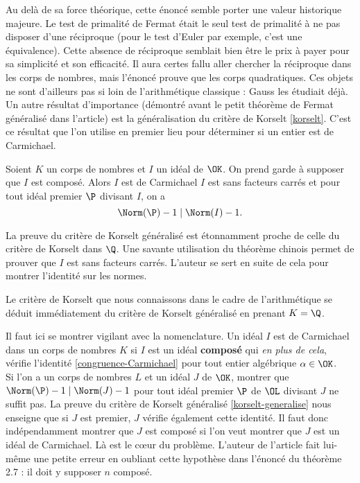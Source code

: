 Au delà de sa force théorique, cette énoncé semble porter une valeur historique majeure. Le test de primalité de Fermat était le seul test de primalité à ne pas disposer d'une réciproque (pour le test d'Euler par exemple, c'est une équivalence). Cette absence de réciproque semblait bien être le prix à payer pour sa simplicité et son efficacité. Il aura certes fallu aller chercher la réciproque dans les corps de nombres, mais l'énoncé prouve que les corps quadratiques. Ces objets ne sont d'ailleurs pas si loin de l'arithmétique classique : Gauss les étudiait déjà. \\

Un autre résultat d'importance (démontré avant le petit théorème de Fermat généralisé dans l'article) est la généralisation du critère de Korselt \ref{korselt}. C'est ce résultat que l'on utilise en premier lieu pour déterminer si un entier est de Carmichael.

\begin{theoreme}\label{korselt-generalise}
	Soient $K$ un corps de nombres et $I$ un idéal de $\OK$. On prend garde à supposer que $I$ est composé. Alors $I$ est de Carmichael \ssi $I$ est sans facteurs carrés et pour tout idéal premier $\P$ divisant $I$, on a $$\Norm(\P) - 1 \mid \Norm(I) - 1.$$
\end{theoreme}

\begin{MotSurPreuve}
	La preuve du critère de Korselt généralisé est étonnamment proche de celle du critère de Korselt dans $\Q$. Une savante utilisation du théorème chinois permet de prouver que $I$ est sans facteurs carrés. L'auteur se sert en suite de cela pour montrer l'identité sur les normes.
\end{MotSurPreuve}

\begin{remarque}
	Le critère de Korselt que nous connaissons dans le cadre de l'arithmétique se déduit immédiatement du critère de Korselt généralisé en prenant $K=\Q$.
\end{remarque}

\begin{remarque}
	Il faut ici se montrer vigilant avec la nomenclature. Un idéal $I$ est de Carmichael dans un corps de nombres $K$ si $I$ est un idéal \textbf{composé} qui \emph{en plus de cela}, vérifie l'identité \ref{congruence-Carmichael} pour tout entier algébrique $\alpha \in \OK$. \\ 

\noindent Si l'on a un corps de nombres $L$ et un idéal $J$ de $\OK$, montrer que $\Norm(\P) - 1\mid \Norm(J) - 1$ pour tout idéal premier $\P$ de $\OL$ divisant $J$ ne suffit pas. La preuve du critère de Korselt généralisé \ref{korselt-generalise} nous enseigne que si $J$ est premier, $J$ vérifie également cette identité. Il faut donc indépendamment montrer que $J$ est composé si l'on veut montrer que $J$ est un idéal de Carmichael. Là est le cœur du problème. L'auteur de l'article fait lui-même une petite erreur en oubliant cette hypothèse dans l'énoncé du théorème 2.7 : il doit y supposer $n$ composé.
\end{remarque}

